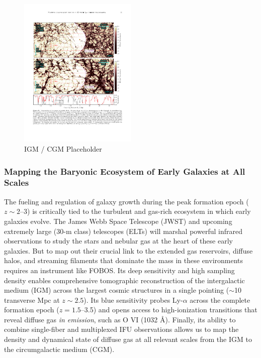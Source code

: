 \documentclass[oneside,11pt]{amsart}
\begin{document}
\begin{figure}\small
%
\includegraphics[width=0.5\textwidth]{figs/qso_LightEcho_v1.pdf}
%
\caption{IGM / CGM Placeholder  }
%
\label{fig:M31}
%
\end{figure}

\subsubsection{Mapping the Baryonic Ecosystem of Early Galaxies at All Scales}
\label{sec:galaxies}

The fueling and regulation of galaxy growth during the peak formation
epoch ($z \sim2$--3) is critically tied to the turbulent and gas-rich
ecosystem in which early galaxies evolve. The James Webb Space
Telescope (JWST) and upcoming extremely large (30-m class) telescopes
(ELTs) will marshal powerful infrared observations to study the stars
and nebular gas at the heart of these early galaxies. But to map out
their crucial link to the extended gas reservoirs, diffuse halos, and
streaming filaments that dominate the mass in these environments
requires an instrument like FOBOS. Its deep sensitivity and high
sampling density enables comprehensive tomographic reconstruction of
the intergalactic medium (IGM) across the largest cosmic structures
in a single pointing ($\sim$10 transverse Mpc at $z \sim 2.5$). Its
blue sensitivity probes Ly-$\alpha$ across the complete formation
epoch ($z = 1.5$--3.5) and opens access to high-ionization
transitions that reveal diffuse gas \emph{in emission}, such as O VI
(1032 \AA). Finally, its ability to combine single-fiber and
multiplexed IFU observations allows us to map the density and
dynamical state of diffuse gas at all relevant scales from the IGM to
the circumgalactic medium (CGM).
\end{document}
